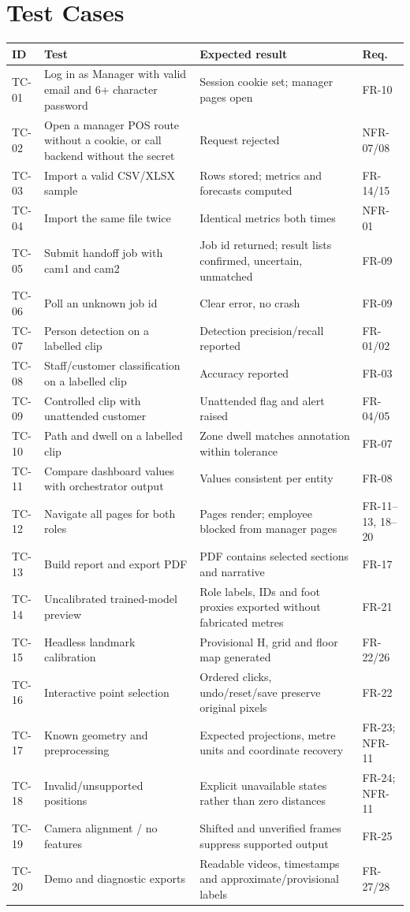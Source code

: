 \section{Test Cases}
\begin{longtable}{P{0.09\textwidth}P{0.3\textwidth}P{0.32\textwidth}P{0.14\textwidth}}
\toprule
ID & Test & Expected result & Req.\\
\midrule
\endhead
TC-01 & Log in as Manager with valid email and 6+ character password & Session cookie set; manager pages open & FR-10\\
TC-02 & Open a manager POS route without a cookie, or call backend without the secret & Request rejected & NFR-07/08\\
TC-03 & Import a valid CSV/XLSX sample & Rows stored; metrics and forecasts computed & FR-14/15\\
TC-04 & Import the same file twice & Identical metrics both times & NFR-01\\
TC-05 & Submit handoff job with cam1 and cam2 & Job id returned; result lists confirmed, uncertain, unmatched & FR-09\\
TC-06 & Poll an unknown job id & Clear error, no crash & FR-09\\
TC-07 & Person detection on a labelled clip & Detection precision/recall reported & FR-01/02\\
TC-08 & Staff/customer classification on a labelled clip & Accuracy reported & FR-03\\
TC-09 & Controlled clip with unattended customer & Unattended flag and alert raised & FR-04/05\\
TC-10 & Path and dwell on a labelled clip & Zone dwell matches annotation within tolerance & FR-07\\
TC-11 & Compare dashboard values with orchestrator output & Values consistent per entity & FR-08\\
TC-12 & Navigate all pages for both roles & Pages render; employee blocked from manager pages & FR-11--13, 18--20\\
TC-13 & Build report and export PDF & PDF contains selected sections and narrative & FR-17\\
TC-14 & Uncalibrated trained-model preview & Role labels, IDs and foot proxies exported without fabricated metres & FR-21\\
TC-15 & Headless landmark calibration & Provisional H, grid and floor map generated & FR-22/26\\
TC-16 & Interactive point selection & Ordered clicks, undo/reset/save preserve original pixels & FR-22\\
TC-17 & Known geometry and preprocessing & Expected projections, metre units and coordinate recovery & FR-23; NFR-11\\
TC-18 & Invalid/unsupported positions & Explicit unavailable states rather than zero distances & FR-24; NFR-11\\
TC-19 & Camera alignment / no features & Shifted and unverified frames suppress supported output & FR-25\\
TC-20 & Demo and diagnostic exports & Readable videos, timestamps and approximate/provisional labels & FR-27/28\\
\bottomrule
\end{longtable}

